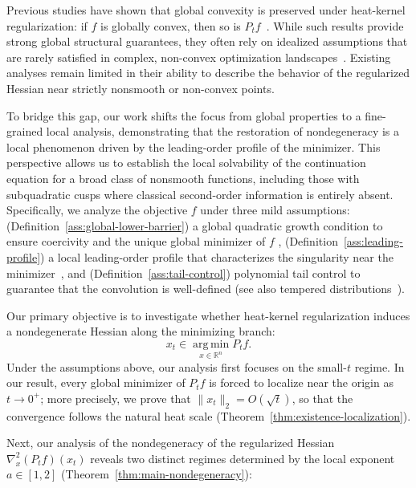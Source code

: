 \documentclass{article}
\begin{document}
Previous studies have shown that global convexity is preserved under heat-kernel regularization: if $f$ is globally convex, then so is $P_t f$~\cite{ishige2026preservation}. While such results provide strong global structural guarantees, they often rely on idealized assumptions that are rarely satisfied in complex, non-convex optimization landscapes~\cite{ma2022beyond, jo2026neural}. Existing analyses remain limited in their ability to describe the behavior of the regularized Hessian near strictly nonsmooth or non-convex points. 

To bridge this gap, our work shifts the focus from global properties to a fine-grained local analysis, demonstrating that the restoration of nondegeneracy is a local phenomenon driven by the leading-order profile of the minimizer. This perspective allows us to establish the local solvability of the continuation equation for a broad class of nonsmooth functions, including those with subquadratic cusps where classical second-order information is entirely absent. Specifically, we analyze the objective $f$ under three mild assumptions: (Definition~\ref{ass:global-lower-barrier}) a global quadratic growth condition to ensure coercivity and the unique global minimizer of $f$ \cite{bonnans2013perturbation, drusvyatskiy2013tilt, chieu2021quadratic, davis2025local, khanh2025local}, (Definition~\ref{ass:leading-profile}) a local leading-order profile that characterizes the singularity near the minimizer~\cite{burke1993weak}, and (Definition~\ref{ass:tail-control}) polynomial tail control to guarantee that the convolution is well-defined (see also tempered distributions~\cite{stein1970singular}). 

Our primary objective is to investigate whether heat-kernel regularization induces a nondegenerate Hessian along the minimizing branch:
$$x_t\in \operatorname*{arg\,min}_{x\in\mathbb R^n} P_t f.$$ Under the assumptions above, our analysis first focuses on the small-$t$ regime. In our result, every global minimizer of $P_t f$ is forced to localize near the origin as $t\to0^+$; more precisely, we prove that $\|x_t\|_2 = O(\sqrt{t})$, so that the convergence follows the natural heat scale (Theorem~\ref{thm:existence-localization}). 

Next, our analysis of the nondegeneracy of the regularized Hessian $\nabla_x^2(P_t f)(x_t)$ reveals two distinct regimes determined by the local exponent $a \in [1, 2]$ (Theorem~\ref{thm:main-nondegeneracy}):
\end{document}
